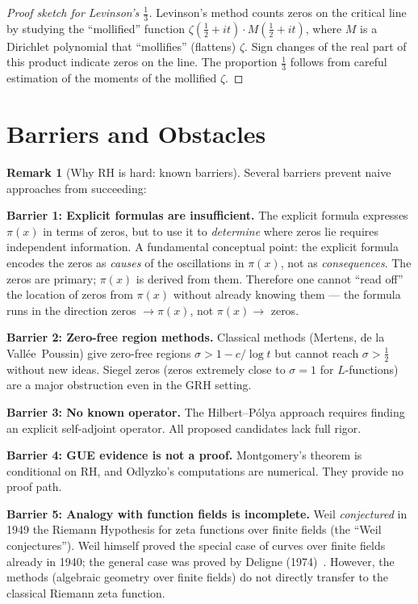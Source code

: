 \documentclass[12pt,a4paper]{amsart}
\theoremstyle{definition}
\newtheorem{remark}[theorem]{Remark}
\begin{document}
\begin{proof}[Proof sketch for Levinson's $\tfrac{1}{3}$]
Levinson's method counts zeros on the critical line by studying the
``mollified'' function $\zeta(\tfrac{1}{2}+it) \cdot M(\tfrac{1}{2}+it)$,
where $M$ is a Dirichlet polynomial that ``mollifies'' (flattens) $\zeta$.
Sign changes of the real part of this product indicate zeros on the line.
The proportion $\tfrac{1}{3}$ follows from careful estimation of the
moments of the mollified $\zeta$.
\end{proof}

\section{Barriers and Obstacles}

\begin{remark}[Why RH is hard: known barriers]
Several barriers prevent naive approaches from succeeding:

\textbf{Barrier 1: Explicit formulas are insufficient.}
The explicit formula expresses $\pi(x)$ in terms of zeros, but to use it
to \emph{determine} where zeros lie requires independent information.
A fundamental conceptual point: the explicit formula encodes the zeros as
\emph{causes} of the oscillations in $\pi(x)$, not as \emph{consequences}.
The zeros are primary; $\pi(x)$ is derived from them.  Therefore one cannot
``read off'' the location of zeros from $\pi(x)$ without already knowing them —
the formula runs in the direction zeros $\to \pi(x)$, not $\pi(x) \to$ zeros.

\textbf{Barrier 2: Zero-free region methods.}
Classical methods (Mertens, de la Vall\'ee~Poussin) give zero-free regions
$\sigma > 1 - c/\log t$ but cannot reach $\sigma > \tfrac{1}{2}$ without
new ideas.  Siegel zeros (zeros extremely close to $\sigma = 1$ for
$L$-functions) are a major obstruction even in the GRH setting.

\textbf{Barrier 3: No known operator.}
The Hilbert--P\'olya approach requires finding an explicit self-adjoint
operator.  All proposed candidates lack full rigor.

\textbf{Barrier 4: GUE evidence is not a proof.}
Montgomery's theorem is conditional on RH, and Odlyzko's computations are
numerical.  They provide no proof path.

\textbf{Barrier 5: Analogy with function fields is incomplete.}
Weil \emph{conjectured} in 1949 the Riemann Hypothesis for zeta functions
over finite fields (the ``Weil conjectures'').  Weil himself proved the
special case of curves over finite fields already in 1940; the general
case was proved by Deligne (1974)~\cite{Deligne1974}.
However, the methods (algebraic geometry over finite fields) do not
directly transfer to the classical Riemann zeta function.
\end{remark}
\end{document}
